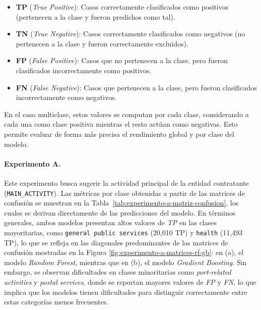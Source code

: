 \documentclass[a4paper,fleqn]{cas-sc}
\begin{document}
\begin{itemize}
	\item \textbf{TP} (\textit{True Positive}): Casos correctamente clasificados como positivos (pertenecen a la clase y fueron predichos como tal).
	\item \textbf{TN} (\textit{True Negative}): Casos correctamente clasificados como negativos (no pertenecen a la clase y fueron correctamente excluidos).
	\item \textbf{FP} (\textit{False Positive}): Casos que no pertenecen a la clase, pero fueron clasificados incorrectamente como positivos.
	\item \textbf{FN} (\textit{False Negative}): Casos que pertenecen a la clase, pero fueron clasificados incorrectamente como negativos.
\end{itemize}

En el caso multiclase, estos valores se computan por cada clase, considerando a cada una como clase positiva mientras el resto actúan como negativas. Esto permite evaluar de forma más precisa el rendimiento global y por clase del modelo.


\paragraph{\textbf{Experimento A.}}

	Este experimento busca sugerir la actividad principal de la entidad contratante (\texttt{MAIN\_ACTIVITY}). Las métricas por clase obtenidas a partir de las matrices de confusión se muestran en la Tabla~\ref{tab:experimento-a-matriz-confusion}, los cuales se derivan directamente de las predicciones del modelo.  En términos generales, ambos modelos presentan altos valores de \textit{TP} en las clases mayoritarias,  como \texttt{general public services} (20,010 TP) y \texttt{health} (11,493 TP), lo que se refleja en las diagonales predominantes de
	las matrices de confusión mostradas en la Figura \ref{fig:experimento-a-matrices-rf-gb}: en (a), el modelo \textit{Random Forest}, mientras que en (b), el modelo \textit{Gradient Boosting}.
	 Sin embargo, se observan dificultades en clases minoritarias como \textit{port-related activities} y \textit{postal services}, donde se reportan mayores valores de \textit{FP} y \textit{FN}, 
%	  
	 	lo que implica que los modelos tienen dificultades para distinguir correctamente entre estas categorías menos frecuentes.
\end{document}
